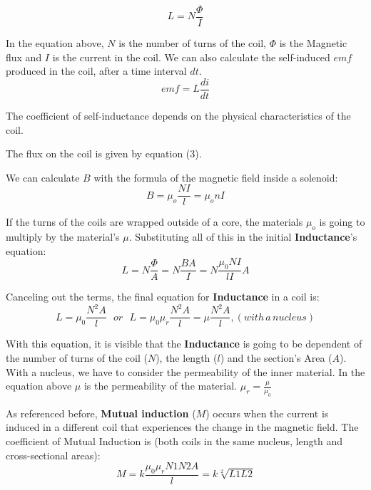\documentclass[a4paper,12pt]{article}
\begin{document}
\begin{equation}
L = N\frac{\Phi }{I} 
\end{equation}


In the equation above, $N$ is the number of turns of the coil, $\Phi$ is the Magnetic flux and $I$ is the current in the coil.
We can also calculate the  self-induced $emf$ produced in the coil, after a time interval $dt$. 
\begin{equation}
emf = L\frac{di}{dt}
\end{equation}

\par
The coefficient of self-inductance depends on the physical characteristics of the coil. 

The flux on the coil is given by equation (3). 


\par
We can calculate $B$ with the formula of the magnetic field inside a solenoid:
\begin{equation}
B = \mu_o\frac{NI}{l} = \mu_onI
\end{equation}

\par 
If the turns of the coils are wrapped outside of a core, the materials $\mu_o$ is going to multiply by the material's $\mu$. Substituting all of this in the initial \textbf{Inductance}'s equation:
\begin{equation}
L = N \frac{\Phi }{A} = N\frac{BA}{I} = N\frac{\mu_0 NI}{lI}A
\end{equation}

\par
Canceling out the terms, the final equation for \textbf{Inductance} in a coil is:
\begin{equation}
L = \mu_0\frac{ N^2A}{l} \,\, \, \, or \, \, \, \, L = \mu_0 \mu_r\frac{ N^2A}{l} = \mu\frac{ N^2A}{l}, (with\, a\, nucleus)
\end{equation}


With this equation, it is visible that the \textbf{Inductance} is going to be dependent of the number of turns of the coil ($N$), the length ($l$) and the section's Area ($A$). With a nucleus, we have to consider the permeability of the inner material. In the equation above $\mu$ is the permeability of the material. $\mu_r = \frac{\mu}{\mu_0}$


\par
As referenced before, \textbf{Mutual induction} ($M$) occurs when the current is induced in a different coil that experiences the change in the magnetic field. The coefficient of Mutual Induction is (both coils in the same nucleus, length and cross-sectional areas):
\begin{equation}
M = k\frac{\mu_0 \mu_r N1N2A}{l} = k\sqrt[2]{L1L2}
\end{equation}
\end{document}
